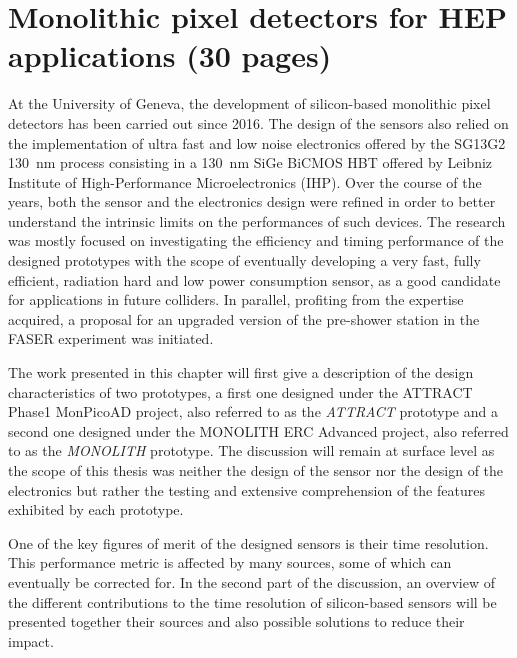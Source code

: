 \chapter{Monolithic pixel detectors for HEP applications (30 pages)}


At the University of Geneva, the development of silicon-based monolithic pixel detectors has been carried out since 2016. The design of the sensors also relied on the implementation of ultra fast and low noise electronics offered by the SG13G2 \SI{130}{\nano\meter} process \cite{IHP130nm} consisting in a \SI{130}{nm} SiGe BiCMOS HBT offered by Leibniz Institute of High-Performance Microelectronics (IHP). Over the course of the years, both the sensor and the electronics design were refined in order to better understand the intrinsic limits on the performances of such devices. The research was mostly focused on investigating the efficiency and timing performance of the designed prototypes with the scope of eventually developing a very fast, fully efficient, radiation hard and low power consumption sensor, as a good candidate for applications in future colliders. In parallel, profiting from the expertise acquired, a proposal for an upgraded version of the pre-shower station in the FASER experiment was initiated.

The work presented in this chapter will first give a description of the design characteristics of two prototypes, a first one designed under the ATTRACT Phase1 MonPicoAD project, also referred to as the \textit{ATTRACT} prototype and a second one designed under the MONOLITH ERC Advanced project, also referred to as the \textit{MONOLITH} prototype. The discussion will remain at surface level as the scope of this thesis was neither the design of the sensor nor the design of the electronics but rather the testing and extensive comprehension of the features exhibited by each prototype.

One of the key figures of merit of the designed sensors is their time resolution. This performance metric is affected by many sources, some of which can eventually be corrected for. In the second part of the discussion, an overview of the different contributions to the time resolution of silicon-based sensors will be presented together their sources and also possible solutions to reduce their impact. 

